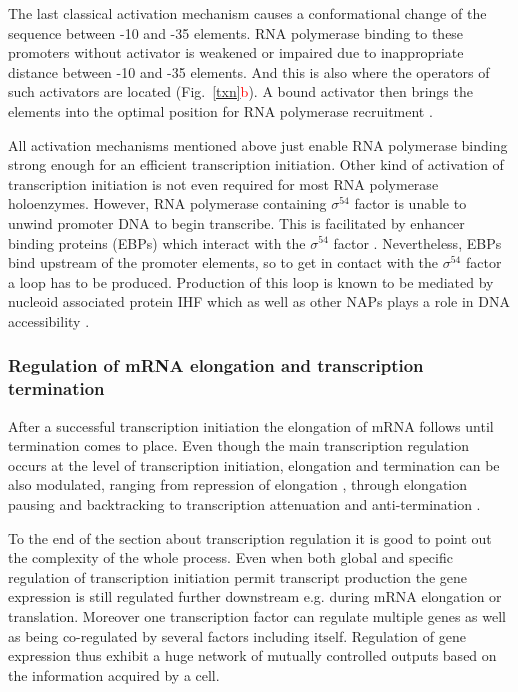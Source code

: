 The last classical activation mechanism causes a conformational change of the sequence between -10 and -35 elements.
RNA polymerase binding to these promoters without activator is weakened or impaired due to inappropriate distance between -10 and -35 elements.
And this is also where the operators of such activators are located (Fig.~\ref{txn}\textcolor{red}{b}).
A bound activator then brings the elements into the optimal position for RNA polymerase recruitment \cite{heldwein2001crystal}.

All activation mechanisms mentioned above just enable RNA polymerase binding strong enough for an efficient transcription initiation.
Other kind of activation of transcription initiation is not even required for most RNA polymerase holoenzymes.
However, RNA polymerase containing $\sigma^{54}$ factor is unable to unwind promoter DNA to begin transcribe.
This is facilitated by enhancer binding proteins (EBPs) which interact with the $\sigma^{54}$ factor \cite{morett1989vivo, cannon2000dna}.
Nevertheless, EBPs bind upstream of the promoter elements, so to get in contact with the $\sigma^{54}$ factor a loop has to be produced.
Production of this loop is known to be mediated by nucleoid associated protein IHF which as well as other NAPs plays a role in DNA accessibility \cite{de1991upstream, sze2001vivo}.

\subsubsection{Regulation of mRNA elongation and transcription termination}
After a successful transcription initiation the elongation of mRNA follows until termination comes to place.
Even though the main transcription regulation occurs at the level of transcription initiation, elongation and termination can be also modulated, ranging from repression of elongation \cite{monsalve1996protein}, through elongation pausing and backtracking \cite{mustaev2017transcription} to transcription attenuation and anti-termination \cite{naville2009transcription}.

To the end of the section about transcription regulation it is good to point out the complexity of the whole process.
Even when both global and specific regulation of transcription initiation permit transcript production the gene expression is still regulated further downstream e.g. during mRNA elongation or translation.
Moreover one transcription factor can regulate multiple genes as well as being co-regulated by several factors including itself.
Regulation of gene expression thus exhibit a huge network of mutually controlled outputs based on the information acquired by a cell.

